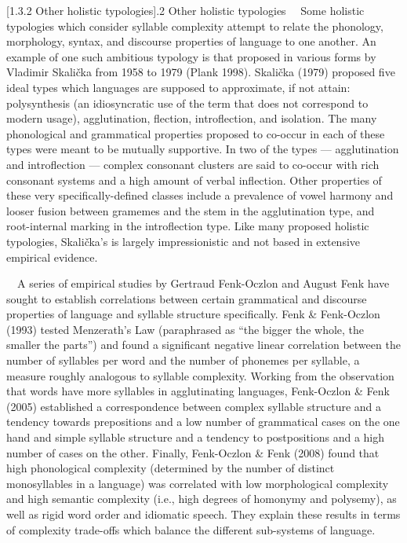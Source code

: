 \documentclass[12pt]{article}
\makeatletter
\renewcommand\section{\@startsection{section}{1}{0.0in}{0in}{0.1mm}{\normalfont\normalsize\fontsize{18pt}{21.6pt}\selectfont\rmfamily\bfseries\upshape\raggedright}}
\newenvironment{styleBody}{\renewcommand\baselinestretch{1.0}\setlength\leftskip{0in}\setlength\rightskip{0in plus 1fil}\setlength\parindent{0in}\setlength\parfillskip{0pt plus 1fil}\setlength\parskip{0in plus 1pt}\writerlistparindent\writerlistleftskip\leavevmode\normalfont\normalsize\fontsize{11pt}{13.2pt}\selectfont\mdseries\upshape\writerlistlabel\ignorespaces}{\unskip\vspace{0in plus 1pt}\par}
\newcommand\writerlistleftskip{}
\newcommand\writerlistparindent{}
\newcommand\writerlistlabel{}
\makeatother
\begin{document}
\section[1.3.2 Other holistic typologies]{.2 Other holistic typologies}
\begin{styleBody}
\ \ Some holistic typologies which consider syllable complexity attempt to relate the phonology, morphology, syntax, and discourse properties of language to one another. An example of one such ambitious typology is that proposed in various forms by Vladimir Skalička from 1958 to 1979 (Plank 1998). Skalička (1979) proposed five ideal types which languages are supposed to approximate, if not attain: polysynthesis (an idiosyncratic use of the term that does not correspond to modern usage), agglutination, flection, introflection, and isolation. The many phonological and grammatical properties proposed to co-occur in each of these types were meant to be mutually supportive. In two of the types — agglutination and introflection — complex consonant clusters are said to co-occur with rich consonant systems and a high amount of verbal inflection. Other properties of these very specifically-defined classes include a prevalence of vowel harmony and looser fusion between gramemes and the stem in the agglutination type, and root-internal marking in the introflection type. Like many proposed holistic typologies, Skalička’s is largely impressionistic and not based in extensive empirical evidence.
\end{styleBody}

\begin{styleBody}
\ \ A series of empirical studies by Gertraud Fenk-Oczlon and August Fenk have sought to establish correlations between certain grammatical and discourse properties of language and syllable structure specifically. Fenk \& Fenk-Oczlon (1993) tested Menzerath’s Law (paraphrased as “the bigger the whole, the smaller the parts”) and found a significant negative linear correlation between the number of syllables per word and the number of phonemes per syllable, a measure roughly analogous to syllable complexity. Working from the observation that words have more syllables in agglutinating languages, Fenk-Oczlon \& Fenk (2005) established a correspondence between complex syllable structure and a tendency towards prepositions and a low number of grammatical cases on the one hand and simple syllable structure and a tendency to postpositions and a high number of cases on the other. Finally, Fenk-Oczlon \& Fenk (2008) found that high phonological complexity (determined by the number of distinct monosyllables in a language) was correlated with low morphological complexity and high semantic complexity (i.e., high degrees of homonymy and polysemy), as well as rigid word order and idiomatic speech. They explain these results in terms of complexity trade-offs which balance the different sub-systems of language.
\end{styleBody}
\end{document}
